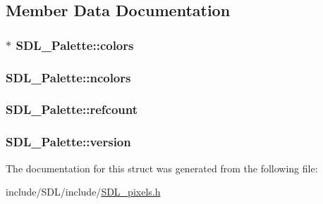 \subsection{Member Data Documentation}
\hypertarget{struct_s_d_l___palette_ad757a50037f43533196e94942440b241}{
\subsubsection[{colors}]{$\ast$ S\-D\-L\-\_\-\-Palette\-::colors}}\label{struct_s_d_l___palette_ad757a50037f43533196e94942440b241}
\hypertarget{struct_s_d_l___palette_a81a0cc3197480e994c6b06f1f0567091}{
\subsubsection[{ncolors}]{ S\-D\-L\-\_\-\-Palette\-::ncolors}}\label{struct_s_d_l___palette_a81a0cc3197480e994c6b06f1f0567091}
\hypertarget{struct_s_d_l___palette_a35c667737f883f973bb0a8dea143b08d}{
\subsubsection[{refcount}]{ S\-D\-L\-\_\-\-Palette\-::refcount}}\label{struct_s_d_l___palette_a35c667737f883f973bb0a8dea143b08d}
\hypertarget{struct_s_d_l___palette_a5b8d45519f6850a32f13f1602ce37a8e}{
\subsubsection[{version}]{ S\-D\-L\-\_\-\-Palette\-::version}}\label{struct_s_d_l___palette_a5b8d45519f6850a32f13f1602ce37a8e}


The documentation for this struct was generated from the following file\-:\begin{DoxyCompactItemize}
\item 
include/\-S\-D\-L/include/\hyperlink{_s_d_l__pixels_8h}{S\-D\-L\-\_\-pixels.\-h}\end{DoxyCompactItemize}
